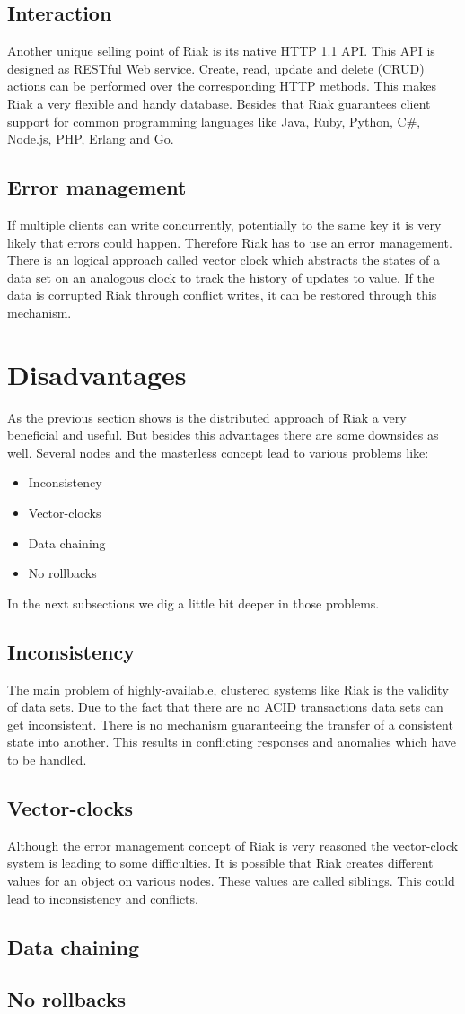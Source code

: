 \subsection{Interaction}
Another unique selling point of Riak is its native HTTP 1.1 API. This API is designed as RESTful Web service. Create, read, update and delete (CRUD) actions can be performed over the corresponding HTTP methods. This makes Riak a very flexible and handy database. 
Besides that Riak guarantees client support for common programming languages like Java, Ruby, Python, C\#, Node.js, PHP, Erlang and Go.  
\subsection{Error management}
If multiple clients can write concurrently, potentially to the same key it is very likely that errors could happen. Therefore Riak has to use an error management. There is an logical approach called vector clock which abstracts the states of a data set on an analogous clock to track the history of updates to value. If the data is corrupted Riak through conflict writes, it can be restored through this mechanism. 
\section{Disadvantages}
As the previous section shows is the distributed approach of Riak a very beneficial and useful. But besides this advantages there are some downsides as well. Several nodes and the masterless concept lead to various problems like:
 \begin{itemize}
 	\item Inconsistency
 	\item Vector-clocks
 	\item Data chaining
 	\item No rollbacks
 \end{itemize}
 In the next subsections we dig a little bit deeper in those problems.
 \subsection{Inconsistency}
 The main problem of highly-available, clustered systems like Riak is the validity of data sets. Due to the fact that there are no ACID transactions data sets can get inconsistent. There is no mechanism guaranteeing the transfer of a consistent state into another. This results in conflicting responses and anomalies which have to be handled.  
 \subsection{Vector-clocks}
 Although the error management concept of Riak is very reasoned the vector-clock system is leading to some difficulties. It is possible that Riak creates different values for an object on various nodes. These values are called siblings. This could lead to inconsistency and conflicts.
 \subsection{Data chaining}
 \subsection{No rollbacks}
 \newpage